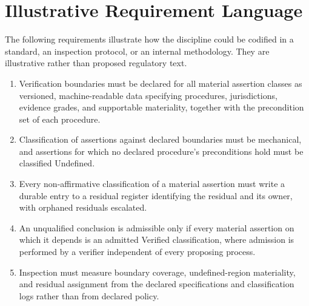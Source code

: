 \documentclass[smallcondensed,envcountsect,natbib]{svjour3}
\newcommand{\state}[1]{\textsf{#1}}
\begin{document}
\appendix

\section{Illustrative Requirement Language}
\label{app:requirements}

The following requirements illustrate how the discipline could be codified in a standard, an inspection protocol, or an internal methodology. They are illustrative rather than proposed regulatory text.

\begin{enumerate}
\item Verification boundaries must be declared for all material assertion classes as versioned, machine-readable data specifying procedures, jurisdictions, evidence grades, and supportable materiality, together with the precondition set of each procedure.
\item Classification of assertions against declared boundaries must be mechanical, and assertions for which no declared procedure's preconditions hold must be classified \state{Undefined}.
\item Every non-affirmative classification of a material assertion must write a durable entry to a residual register identifying the residual and its owner, with orphaned residuals escalated.
\item An unqualified conclusion is admissible only if every material assertion on which it depends is an admitted \state{Verified} classification, where admission is performed by a verifier independent of every proposing process.
\item Inspection must measure boundary coverage, undefined-region materiality, and residual assignment from the declared specifications and classification logs rather than from declared policy.
\end{enumerate}
\end{document}
